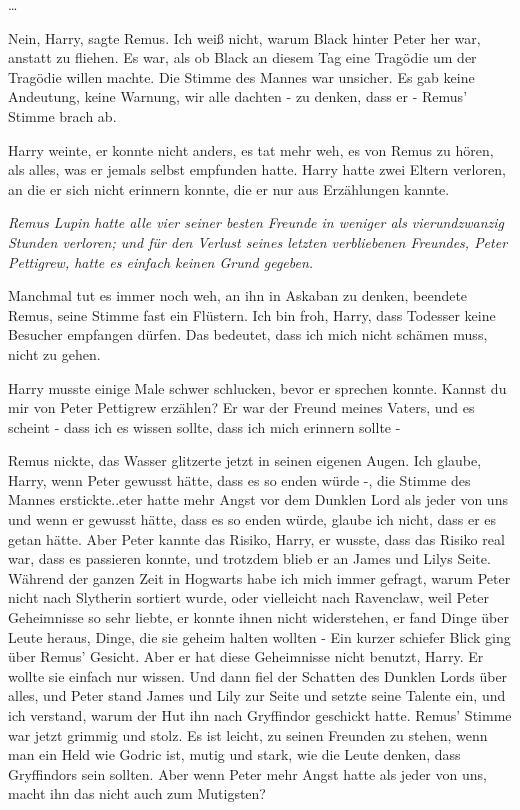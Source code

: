…

\glqq{}Nein, Harry\grqq{}, sagte Remus. \glqq{}Ich weiß nicht, warum Black hinter
Peter her war, anstatt zu fliehen. Es war, als ob Black an diesem Tag eine
Tragödie um der Tragödie willen machte.\grqq{} Die Stimme des Mannes war unsicher.
\glqq{}Es gab keine Andeutung, keine Warnung, wir alle dachten - zu denken, dass
er -\grqq{} Remus' Stimme brach ab.

Harry weinte, er konnte nicht anders, es tat mehr weh, es von Remus zu hören,
als alles, was er jemals selbst empfunden hatte. Harry hatte zwei Eltern
verloren, an die er sich nicht erinnern konnte, die er nur aus Erzählungen
kannte.

\emph{Remus Lupin hatte alle vier seiner besten Freunde in weniger als
vierundzwanzig Stunden verloren; und für den Verlust seines letzten
verbliebenen Freundes, Peter Pettigrew, hatte es einfach keinen Grund gegeben.}

\glqq{}Manchmal tut es immer noch weh, an ihn in Askaban zu denken\grqq{},
beendete Remus, seine Stimme fast ein Flüstern. \glqq{}Ich bin froh, Harry, dass
Todesser keine Besucher empfangen dürfen. Das bedeutet, dass ich mich nicht
schämen muss, nicht zu gehen.\grqq{}

Harry musste einige Male schwer schlucken, bevor er sprechen konnte. \glqq{}
Kannst du mir von Peter Pettigrew erzählen? Er war der Freund meines Vaters, und
es scheint - dass ich es wissen sollte, dass ich mich erinnern sollte -\grqq{}

Remus nickte, das Wasser glitzerte jetzt in seinen eigenen Augen. \glqq{}Ich
glaube, Harry, wenn Peter gewusst hätte, dass es so enden würde -\grqq{}, die
Stimme des Mannes erstickte.\grqq{}.eter hatte mehr Angst vor dem Dunklen Lord
als jeder von uns und wenn er gewusst hätte, dass es so enden würde, glaube ich
nicht, dass er es getan hätte. Aber Peter kannte das Risiko, Harry, er wusste,
dass das Risiko real war, dass es passieren konnte, und trotzdem blieb er an
James und Lilys Seite. Während der ganzen Zeit in Hogwarts habe ich mich immer
gefragt, warum Peter nicht nach Slytherin sortiert wurde, oder vielleicht nach
Ravenclaw, weil Peter Geheimnisse so sehr liebte, er konnte ihnen nicht
widerstehen, er fand Dinge über Leute heraus, Dinge, die sie geheim halten
wollten -\grqq{} Ein kurzer schiefer Blick ging über Remus' Gesicht. \glqq{}Aber er hat
diese Geheimnisse nicht benutzt, Harry. Er wollte sie einfach nur wissen. Und
dann fiel der Schatten des Dunklen Lords über alles, und Peter stand James und
Lily zur Seite und setzte seine Talente ein, und ich verstand, warum der Hut ihn
nach Gryffindor geschickt hatte.\grqq{} Remus' Stimme war jetzt grimmig und stolz.
\glqq{}Es ist leicht, zu seinen Freunden zu stehen, wenn man ein Held wie Godric
ist, mutig und stark, wie die Leute denken, dass Gryffindors sein sollten. Aber
wenn Peter mehr Angst hatte als jeder von uns, macht ihn das nicht auch zum
Mutigsten?\grqq{}


